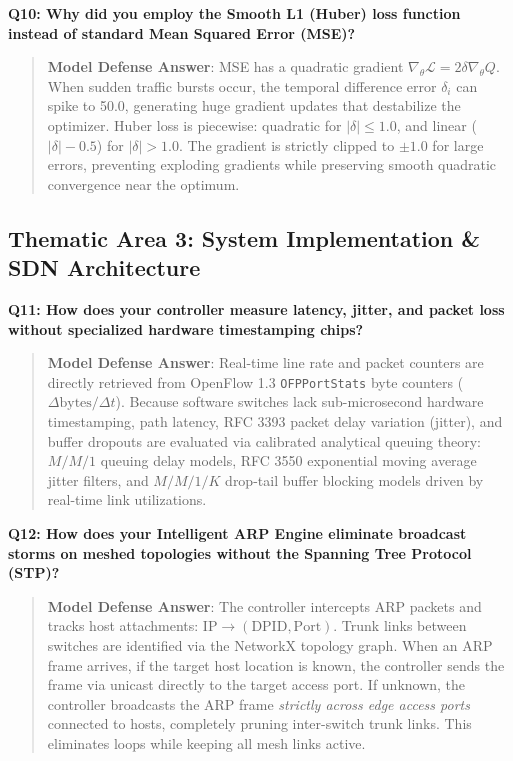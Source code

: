 \noindent\textbf{Q10: Why did you employ the Smooth L1 (Huber) loss function instead of standard Mean Squared Error (MSE)?}
\begin{quote}
\small
\textbf{Model Defense Answer}: MSE has a quadratic gradient $\nabla_\theta \mathcal{L} = 2\delta \nabla_\theta Q$. When sudden traffic bursts occur, the temporal difference error $\delta_i$ can spike to 50.0, generating huge gradient updates that destabilize the optimizer. Huber loss is piecewise: quadratic for $|\delta| \le 1.0$, and linear ($|\delta| - 0.5$) for $|\delta| > 1.0$. The gradient is strictly clipped to $\pm 1.0$ for large errors, preventing exploding gradients while preserving smooth quadratic convergence near the optimum.
\end{quote}

\subsection{Thematic Area 3: System Implementation \& SDN Architecture}

\noindent\textbf{Q11: How does your controller measure latency, jitter, and packet loss without specialized hardware timestamping chips?}
\begin{quote}
\small
\textbf{Model Defense Answer}: Real-time line rate and packet counters are directly retrieved from OpenFlow 1.3 \texttt{OFPPortStats} byte counters ($\Delta \text{bytes} / \Delta t$). Because software switches lack sub-microsecond hardware timestamping, path latency, RFC 3393 packet delay variation (jitter), and buffer dropouts are evaluated via calibrated analytical queuing theory: $M/M/1$ queuing delay models, RFC 3550 exponential moving average jitter filters, and $M/M/1/K$ drop-tail buffer blocking models driven by real-time link utilizations.
\end{quote}

\noindent\textbf{Q12: How does your Intelligent ARP Engine eliminate broadcast storms on meshed topologies without the Spanning Tree Protocol (STP)?}
\begin{quote}
\small
\textbf{Model Defense Answer}: The controller intercepts ARP packets and tracks host attachments: $\text{IP} \to (\text{DPID}, \text{Port})$. Trunk links between switches are identified via the NetworkX topology graph. When an ARP frame arrives, if the target host location is known, the controller sends the frame via unicast directly to the target access port. If unknown, the controller broadcasts the ARP frame \emph{strictly across edge access ports} connected to hosts, completely pruning inter-switch trunk links. This eliminates loops while keeping all mesh links active.
\end{quote}

